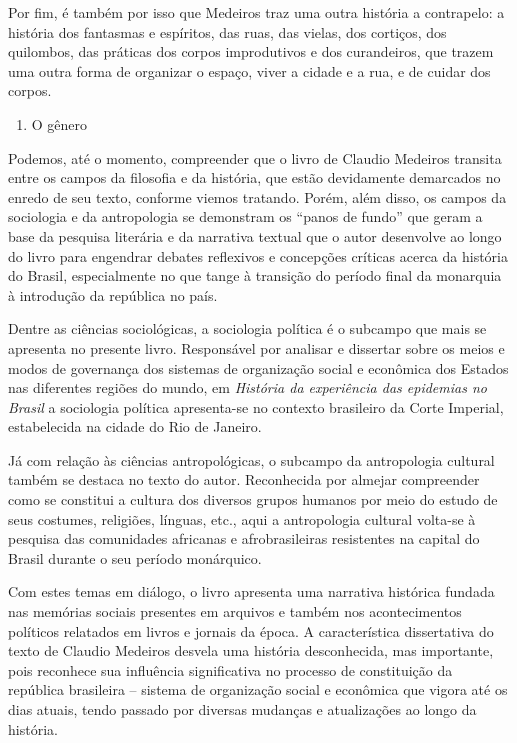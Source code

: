 Por fim, é também por isso que Medeiros traz uma outra história a
contrapelo: a história dos fantasmas e espíritos, das ruas, das vielas,
dos cortiços, dos quilombos, das práticas dos corpos improdutivos e dos
curandeiros, que trazem uma outra forma de organizar o espaço, viver a
cidade e a rua, e de cuidar dos corpos.

\begin{enumerate}
\def\labelenumi{\arabic{enumi}.}
\setcounter{enumi}{12}
\tightlist
\item
  O gênero
\end{enumerate}

Podemos, até o momento, compreender que o livro de Claudio Medeiros
transita entre os campos da filosofia e da história, que estão
devidamente demarcados no enredo de seu texto, conforme viemos tratando.
Porém, além disso, os campos da sociologia e da antropologia se
demonstram os ``panos de fundo'' que geram a base da pesquisa literária
e da narrativa textual que o autor desenvolve ao longo do livro para
engendrar debates reflexivos e concepções críticas acerca da história do
Brasil, especialmente no que tange à transição do período final da
monarquia à introdução da república no país.

Dentre as ciências sociológicas, a sociologia política é o subcampo que
mais se apresenta no presente livro. Responsável por analisar e
dissertar sobre os meios e modos de governança dos sistemas de
organização social e econômica dos Estados nas diferentes regiões do
mundo, em \emph{História da experiência das epidemias no Brasil} a
sociologia política apresenta-se no contexto brasileiro da Corte
Imperial, estabelecida na cidade do Rio de Janeiro.

Já com relação às ciências antropológicas, o subcampo da antropologia
cultural também se destaca no texto do autor. Reconhecida por almejar
compreender como se constitui a cultura dos diversos grupos humanos por
meio do estudo de seus costumes, religiões, línguas, etc., aqui a
antropologia cultural volta-se à pesquisa das comunidades africanas e
afrobrasileiras resistentes na capital do Brasil durante o seu período
monárquico.

Com estes temas em diálogo, o livro apresenta uma narrativa histórica
fundada nas memórias sociais presentes em arquivos e também nos
acontecimentos políticos relatados em livros e jornais da época. A
característica dissertativa do texto de Claudio Medeiros desvela uma
história desconhecida, mas importante, pois reconhece sua influência
significativa no processo de constituição da república brasileira --
sistema de organização social e econômica que vigora até os dias atuais,
tendo passado por diversas mudanças e atualizações ao longo da história.

